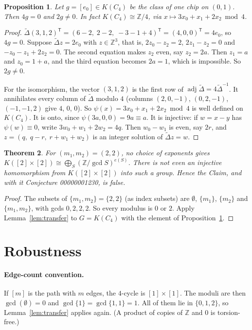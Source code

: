 \documentclass[11pt]{article}
\newtheorem{theorem}{Theorem}
\newtheorem{proposition}[theorem]{Proposition}
\theoremstyle{definition}
\theoremstyle{remark}
\newcommand{\Z}{\mathbb{Z}}
\begin{document}
\begin{proposition}\label{prop:c4}
Let $g=[e_0]\in K(C_4)$ be the class of one chip on $(0,1)$. Then $4g=0$ and
$2g\neq0$. In fact $K(C_4)\cong\Z/4$, via $x\mapsto 3x_0+x_1+2x_2\bmod 4$.
\end{proposition}
\begin{proof}
$\tilde\Delta(3,1,2)^{\mathsf T}=(6-2,\;2-2,\;-3-1+4)^{\mathsf T}=(4,0,0)^{\mathsf T}=4e_0$, so $4g=0$.
Suppose $\tilde\Delta z=2e_0$ with $z\in\Z^3$, that is,
$2z_0-z_2=2$, $2z_1-z_2=0$ and $-z_0-z_1+2z_2=0$. The second equation makes $z_2$
even, say $z_2=2a$. Then $z_1=a$ and $z_0=1+a$, and the third equation becomes
$2a=1$, which is impossible. So $2g\ne0$.

For the isomorphism, the vector $(3,1,2)$ is the first row of
$\operatorname{adj}\tilde\Delta=4\tilde\Delta^{-1}$. It annihilates every column
of $\tilde\Delta$ modulo $4$ (columns $(2,0,-1)$, $(0,2,-1)$, $(-1,-1,2)$ give
$4$, $0$, $0$). So $\psi(x)=3x_0+x_1+2x_2\bmod4$ is well defined on $K(C_4)$.
It is onto, since $\psi(3a,0,0)=9a\equiv a$. It is injective: if
$w=x-y$ has $\psi(w)\equiv0$, write $3w_0+w_1+2w_2=4q$. Then $w_0-w_1$ is even,
say $2r$, and $z=(q,\;q-r,\;r+w_1+w_2)$ is an integer solution of
$\tilde\Delta z=w$.
\end{proof}

\begin{theorem}\label{thm:main}
For $(m_1,m_2)=(2,2)$, no choice of exponents gives
$K([2]\times[2])\cong\bigoplus_S(\Z/\gcd S)^{e(S)}$. There is not even an
injective homomorphism from $K([2]\times[2])$ into such a group. Hence the
Claim, and with it Conjecture 00000001230, is false.
\end{theorem}
\begin{proof}
The subsets of $\{m_1,m_2\}=\{2,2\}$ (as index subsets) are $\emptyset$,
$\{m_1\}$, $\{m_2\}$ and $\{m_1,m_2\}$, with gcds $0,2,2,2$. So every modulus
is $0$ or $2$. Apply Lemma~\ref{lem:transfer} to $G=K(C_4)$ with the element of
Proposition~\ref{prop:c4}.
\end{proof}

\section{Robustness}\label{sec:readings}
\paragraph{Edge-count convention.} If $[m]$ is the path with $m$ edges, the
$4$-cycle is $[1]\times[1]$. The moduli are then $\gcd(\emptyset)=0$ and
$\gcd\{1\}=\gcd\{1,1\}=1$. All of them lie in $\{0,1,2\}$, so Lemma~\ref{lem:transfer}
applies again. (A product of copies of $\Z$ and $0$ is torsion-free.)
\end{document}
